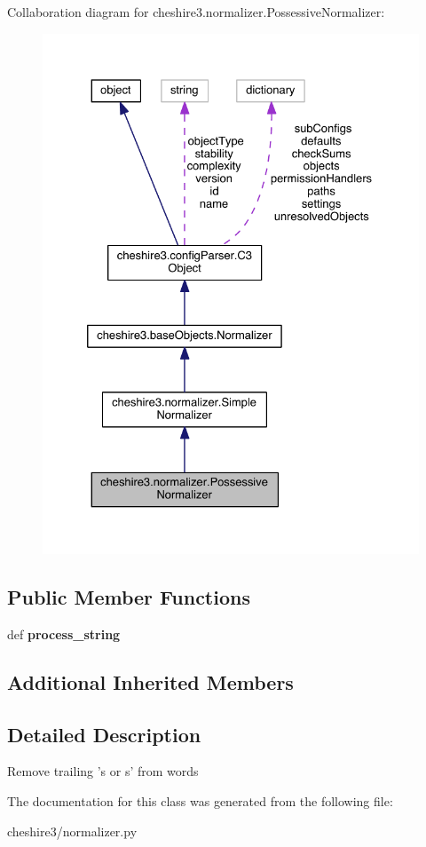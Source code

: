 Collaboration diagram for cheshire3.\-normalizer.\-Possessive\-Normalizer\-:
\nopagebreak
\begin{figure}[H]
\begin{center}
\leavevmode
\includegraphics[width=328pt]{classcheshire3_1_1normalizer_1_1_possessive_normalizer__coll__graph}
\end{center}
\end{figure}
\subsection*{Public Member Functions}
\begin{DoxyCompactItemize}
\item 
\hypertarget{classcheshire3_1_1normalizer_1_1_possessive_normalizer_a2ea00c147d3418a312d6f52473da4e0d}{def {\bfseries process\-\_\-string}}\label{classcheshire3_1_1normalizer_1_1_possessive_normalizer_a2ea00c147d3418a312d6f52473da4e0d}

\end{DoxyCompactItemize}
\subsection*{Additional Inherited Members}


\subsection{Detailed Description}
\begin{DoxyVerb}Remove trailing 's or s' from words \end{DoxyVerb}
 

The documentation for this class was generated from the following file\-:\begin{DoxyCompactItemize}
\item 
cheshire3/normalizer.\-py\end{DoxyCompactItemize}
